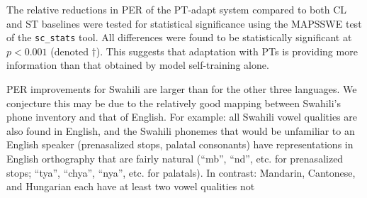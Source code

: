 The relative reductions in PER
of the {\sc PT-adapt} system
compared to both {\sc CL} and {\sc ST} baselines
were tested for statistical significance using the MAPSSWE test of the
{\tt sc\_stats} tool.  All differences were found to be statistically
significant at $p<0.001$ (denoted $\dagger$).  This suggests that adaptation
with PTs is providing more information than that obtained by model
self-training alone.

PER improvements for Swahili are larger than for the other three
languages. %
We conjecture this may be due to the relatively good mapping between
Swahili's phone inventory and that of English. For example: all Swahili
vowel qualities are also found in English, and the Swahili phonemes 
that would be unfamiliar to an English speaker (prenasalized stops, 
palatal consonants) have representations in English orthography that are 
fairly natural (``mb'', ``nd'', etc. for prenasalized stops; ``tya'', 
``chya'', ``nya'', etc. for palatals). In contrast: Mandarin, 
Cantonese, and Hungarian each have at least two vowel qualities not 
